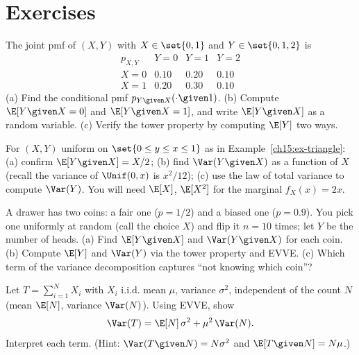 \section{Exercises}
\label{ch15:exercises}

\begin{exercise}
\label{ch15:exr-table}
The joint pmf of $(X,Y)$ with $X \in \set{0,1}$ and $Y \in \set{0,1,2}$ is
\[
  \begin{array}{c|ccc}
    p_{X,Y} & Y{=}0 & Y{=}1 & Y{=}2 \\\hline
    X{=}0 & 0.10 & 0.20 & 0.10 \\
    X{=}1 & 0.20 & 0.30 & 0.10
  \end{array}
\]
(a) Find the conditional pmf $p_{Y\given X}(\cdot\given 1)$. (b) Compute $\E[Y\given X = 0]$ and
$\E[Y\given X=1]$, and write $\E[Y\given X]$ as a random variable. (c) Verify the tower property by
computing $\E[Y]$ two ways.
\end{exercise}

\begin{exercise}
\label{ch15:exr-triangle}
For $(X,Y)$ uniform on $\set{0\le y \le x \le 1}$ as in Example~\ref{ch15:ex-triangle}: (a) confirm
$\E[Y\given X] = X/2$; (b) find $\Var(Y\given X)$ as a function of $X$ (recall the variance of
$\Unif(0,x)$ is $x^2/12$); (c) use the law of total variance to compute $\Var(Y)$. You will need
$\E[X]$, $\E[X^2]$ for the marginal $f_X(x) = 2x$.
\end{exercise}

\begin{exercise}
\label{ch15:exr-mixture}
A drawer has two coins: a fair one ($p=1/2$) and a biased one ($p=0.9$). You pick one uniformly at
random (call the choice $X$) and flip it $n = 10$ times; let $Y$ be the number of heads. (a) Find
$\E[Y\given X]$ and $\Var(Y\given X)$ for each coin. (b) Compute $\E[Y]$ and $\Var(Y)$ via the tower
property and EVVE. (c) Which term of the variance decomposition captures ``not knowing which coin''?
\end{exercise}

\begin{exercise}
\label{ch15:exr-random-sum}
Let $T = \sum_{i=1}^N X_i$ with $X_i$ i.i.d. mean $\mu$, variance $\sigma^2$, independent of the count
$N$ (mean $\E[N]$, variance $\Var(N)$). Using EVVE, show
\[
  \Var(T) = \E[N]\,\sigma^2 + \mu^2\,\Var(N).
\]
Interpret each term. (Hint: $\Var(T\given N) = N\sigma^2$ and $\E[T\given N] = N\mu$.)
\end{exercise}

